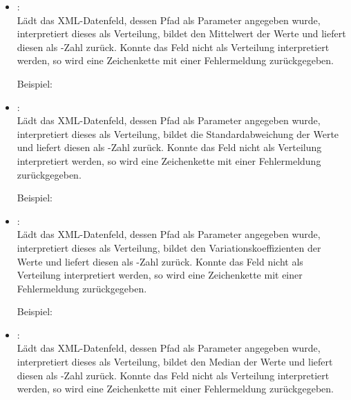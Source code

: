 \begin{itemize}
\item
{}:\\
Lädt das XML-Datenfeld, dessen Pfad als Parameter angegeben wurde, interpretiert dieses als Verteilung,
bildet den Mittelwert der Werte und liefert diesen als -Zahl zurück.
Konnte das Feld nicht als Verteilung interpretiert werden, so wird eine Zeichenkette mit einer Fehlermeldung
zurückgegeben.

Beispiel:\\

\item
{}:\\
Lädt das XML-Datenfeld, dessen Pfad als Parameter angegeben wurde, interpretiert dieses als Verteilung,
bildet die Standardabweichung der Werte und liefert diesen als -Zahl zurück.
Konnte das Feld nicht als Verteilung interpretiert werden, so wird eine Zeichenkette mit einer Fehlermeldung
zurückgegeben.

Beispiel:\\

\item
{}:\\
Lädt das XML-Datenfeld, dessen Pfad als Parameter angegeben wurde, interpretiert dieses als Verteilung,
bildet den Variationskoeffizienten der Werte und liefert diesen als -Zahl zurück.
Konnte das Feld nicht als Verteilung interpretiert werden, so wird eine Zeichenkette mit einer Fehlermeldung
zurückgegeben.

Beispiel:\\

\item
{}:\\
Lädt das XML-Datenfeld, dessen Pfad als Parameter angegeben wurde, interpretiert dieses als Verteilung,
bildet den Median der Werte und liefert diesen als -Zahl zurück.
Konnte das Feld nicht als Verteilung interpretiert werden, so wird eine Zeichenkette mit einer Fehlermeldung
zurückgegeben.


\end{itemize}
